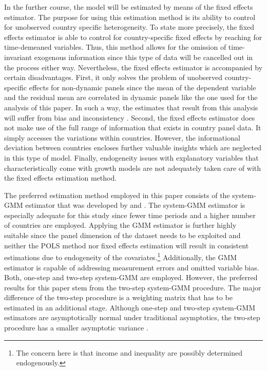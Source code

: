 \documentclass[12pt, a4paper]{article}
\begin{document}
In the further course, the model will be estimated by means of the fixed effects estimator. The purpose for using this estimation method is its ability to control for unobserved country specific heterogeneity. To state more precisely, the fixed effects estimator is able to control for country-specific fixed effects by reaching for time-demeaned variables. Thus, this method allows for the omission of time-invariant exogenous information since this type of data will be cancelled out in the process either way. Nevertheless, the fixed effects estimator is accompanied by certain disadvantages. First, it only solves the problem of unobserved country-specific effects for non-dynamic panels since the mean of the dependent variable and the residual mean are correlated in dynamic panels like the one used for the analysis of this paper. In such a way, the estimates that result from this analysis will suffer from bias and inconsistency \cite{nickell1981}. Second, the fixed effects estimator does not make use of the full range of information that exists in country panel data. It simply accesses the variations within countries. However, the informational deviation between countries encloses further valuable insights which are neglected in this type of model. Finally, endogeneity issues with explanatory variables that characteristically come with growth models are not adequately taken care of with the fixed effects estimation method.

The preferred estimation method employed in this paper consists of the system-GMM estimator that was developed by  and . The system-GMM estimator is especially adequate for this study since fewer time periods and a higher number of countries are employed. Applying the GMM estimator is further highly suitable since the panel dimension of the dataset needs to be exploited and neither the POLS method nor fixed effects estimation will result in consistent estimations due to endogeneity of the covariates.\footnote{The concern here is that income and inequality are possibly determined endogenously.} Additionally, the GMM estimator is capable of addressing measurement errors and omitted variable bias. Both, one-step and two-step system-GMM are employed. However, the preferred results for this paper stem from the two-step system-GMM procedure. The major difference of the two-step procedure is a weighting matrix that has to be estimated in an additional stage. Although one-step and two-step system-GMM estimators are asymptotically normal under traditional asymptotics, the two-step procedure has a smaller asymptotic variance \cite{hwang2018}.
\end{document}
